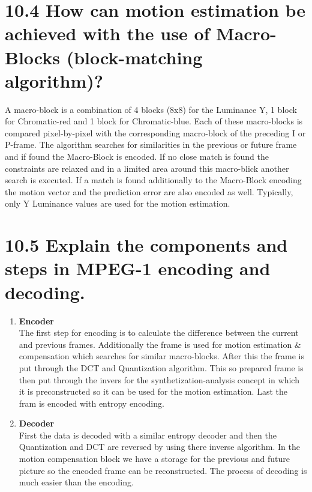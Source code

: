 \documentclass{article}
\begin{document}
	\section*{10.4 How can motion estimation be achieved with the use of Macro-Blocks (block-matching algorithm)?}
	\begin{adjustwidth}{2em}{2em}
		A macro-block is a combination of 4 blocks (8x8) for the Luminance Y, 1 block for Chromatic-red and 1 block for Chromatic-blue. Each of these macro-blocks is compared pixel-by-pixel with the corresponding macro-block of the preceding I or P-frame. The algorithm searches for similarities in the previous or future frame and if found the Macro-Block is encoded. If no close match is found the constraints are relaxed and in a limited area around this macro-blick another search is executed. If a match is found additionally to the Macro-Block encoding the motion vector and the prediction error are also encoded as well. Typically, only Y Luminance values are used for the motion estimation.
	\end{adjustwidth}
	
	\section*{10.5 Explain the components and steps in MPEG-1 encoding and decoding.}
	\begin{adjustwidth}{2em}{2em}
		\begin{enumerate}
			\item \textbf{Encoder} \\
			The first step for encoding is to calculate the difference between the current and previous frames. Additionally the frame is used for motion estimation \& compensation which searches for similar macro-blocks. After this the frame is put through the DCT and Quantization algorithm. This so prepared frame is then put through the invers for the synthetization-analysis concept in which it is preconstructed so it can be used for the motion estimation. Last the fram is encoded with entropy encoding.
			\item \textbf{Decoder} \\
			First the data is decoded with a similar entropy decoder and then the Quantization and DCT are reversed by using there inverse algorithm. In the motion compensation block we have a storage for the previous and future picture so the encoded frame can be reconstructed. The process of decoding is much easier than the encoding.
		\end{enumerate}
	\end{adjustwidth}
	
\end{document}
